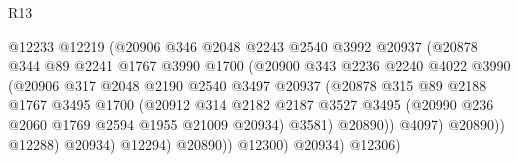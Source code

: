 \begin{lexlean}{R13}
\begin{coremodule}
                                    @12233
                                    @12219
                                    (@20906
                                      @346
                                      @2048
                                      @2243
                                      @2540
                                      @3992
                                      @20937
                                      (@20878
                                        @344
                                        @89
                                        @2241
                                        @1767
                                        @3990
                                        @1700
                                        (@20900
                                          @343
                                          @2236
                                          @2240
                                          @4022
                                          @3990
                                          (@20906
                                            @317
                                            @2048
                                            @2190
                                            @2540
                                            @3497
                                            @20937
                                            (@20878
                                              @315
                                              @89
                                              @2188
                                              @1767
                                              @3495
                                              @1700
                                              (@20912
                                                @314
                                                @2182
                                                @2187
                                                @3527
                                                @3495
                                                (@20990 @236 @2060 @1769 @2594 @1955 @21009 @20934)
                                                @3581)
                                              @20890))
                                          @4097)
                                        @20890))
                                    @12288)
                                  @20934)
                                @12294)
                              @20890))
                          @12300)
                        @20934)
                      @12306)

\end{coremodule}
\end{lexlean}
